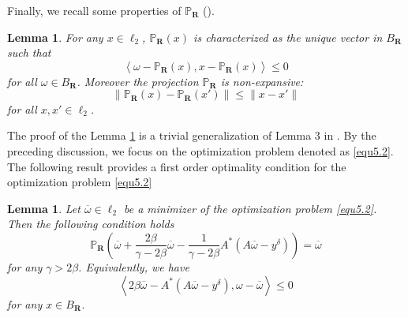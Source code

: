 \documentclass[a4paper,12pt]{article}
\newtheorem{lemma}[theorem]{Lemma}
\numberwithin{equation}{section}
\begin{document}
\par Finally, we recall some properties of $\mathbb{P}_{\mathbf{R}}$ (\cite{DFL08}).

\begin{lemma}\label{lem5.2}
    For any $x\in\ell_{2}$, $\mathbb{P}_{\mathbf{R}}(x)$ is characterized as the unique vector in $B_{\mathbf{R}}$ such that 
    \begin{equation*}
        \left<\omega-\mathbb{P}_{\mathbf{R}}(x),x-\mathbb{P}_{\mathbf{R}}(x)\right>\leq 0
    \end{equation*}
    for all $\omega\in B_{\mathbf{R}}$. Moreover the projection $\mathbb{P}_{\mathbf{R}}$ is non-expansive:
    \begin{equation*}
        \|\mathbb{P}_{\mathbf{R}}(x)-\mathbb{P}_{\mathbf{R}}(x')\|\leq\|x-x'\|
    \end{equation*}
    for all $x,x'\in\ell_{2}$.
\end{lemma}
\par The proof of the Lemma \ref{lem5.2} is a trivial generalization of Lemma 3 in \cite{DFL08}. By the preceding discussion, we focus on the optimization problem denoted as \eqref{equ5.2}. The following result provides a first order optimality condition for the optimization problem \eqref{equ5.2}

\begin{lemma}\label{lem5.3}
    Let $\overline{\omega}\in\ell_{2}$ be a minimizer of the optimization problem \eqref{equ5.2}. Then the following condition holds
    \begin{equation}\label{equ5.3}
        \mathbb{P}_{\mathbf{R}}\left(\overline{\omega}+\frac{2\beta}{\gamma-2\beta}\overline{\omega}- \frac{1}{\gamma-2\beta}A^{*}\left(A\overline{\omega}-y^{\delta}\right)\right) =\overline{\omega}
    \end{equation}
    for any $\gamma>2\beta$. Equivalently, we have
    \begin{equation}\label{equ5.4}
        \left<2\beta\overline{\omega} -A^{*}\left(A\overline{\omega}-y^{\delta}\right), \omega-\overline{\omega}\right>\leq 0 
    \end{equation}
    for any $x\in B_{\mathbf{R}}$.
\end{lemma}
\end{document}
